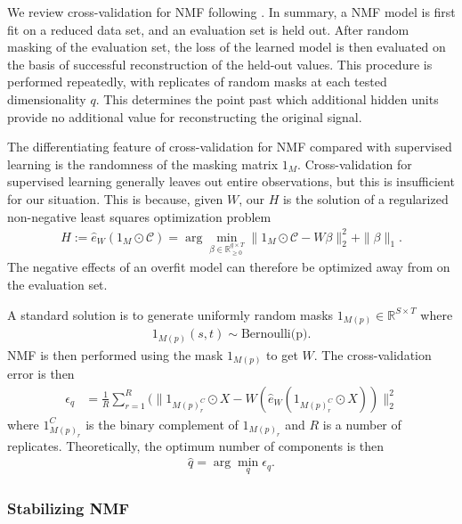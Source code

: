 We review cross-validation for NMF following \citep{Perry2009-ia}.
In summary, a NMF model is first fit on a reduced data set, and an evaluation set is held out.
After random masking of the evaluation set, the loss of the learned model is then evaluated on the basis of successful reconstruction of the held-out values.
This procedure is performed repeatedly, with replicates of random masks at each tested dimensionality $q$.
This determines the point past which additional hidden units provide no additional value for reconstructing the original signal.

The differentiating feature of cross-validation for NMF compared with supervised learning is the randomness of the masking matrix $1_M$.
Cross-validation for supervised learning generally leaves out entire observations, but this is insufficient for our situation.
This is because, given $W$, our $H$ is the solution of a regularized non-negative least squares optimization problem
\begin{eqnarray}
H := \widehat e_W(1_{M} \odot \mathcal C) = \arg \min_{\beta \in \mathbb R_{\geq 0}^{q \times T}} \|1_{M} \odot \mathcal C - W \beta\|_2^2 + \|\beta\|_1.
\label{eq:nmf_nnls}
\end{eqnarray}
The negative effects of an overfit model can therefore be optimized away from on the evaluation set.

A standard solution is to generate uniformly random masks $1_{M(p)} \in \mathbb R^{S \times T}$ where
\begin{align*}
1_{M(p)} (s,t) \sim \text{Bernoulli(p)}.
\end{align*}
NMF is then performed using the mask $1_{M(p)}$ to get $W$.
The cross-validation error is then
\begin{align*}
\epsilon_q &= \frac{1}{R} \sum_{r = 1}^R (\|1_{M(p)_r^C} \odot X - W (\widehat e_W (1_{M(p)_r^C} \odot X ))\|_2^2 
\end{align*}
where $1_{M(p)_r}^C$ is the binary complement of $1_{M(p)_r}$ and $R$ is a number of replicates.
Theoretically, the optimum number of components is then
\begin{align*}
    \widehat q = \arg \min_q \epsilon_q.
\end{align*}

\subsubsection{Stabilizing NMF}

